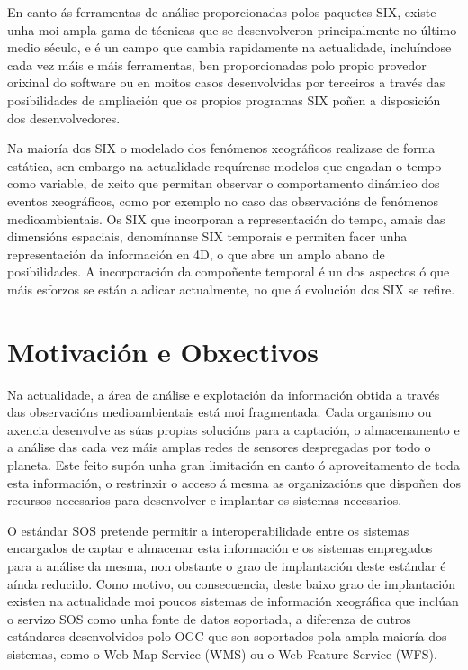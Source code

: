 En canto ás ferramentas de análise proporcionadas polos paquetes SIX, existe unha moi ampla gama de técnicas que se desenvolveron principalmente no último medio século, e é un campo que cambia rapidamente na actualidade, incluíndose cada vez máis e máis ferramentas, ben proporcionadas polo propio provedor orixinal do software ou en moitos casos desenvolvidas por terceiros a través das posibilidades de ampliación que os propios programas SIX poñen a disposición dos desenvolvedores.

Na maioría dos SIX o modelado dos fenómenos xeográficos realizase de forma estática, sen embargo na actualidade requírense modelos que engadan o tempo como variable, de xeito que permitan observar o comportamento dinámico dos eventos xeográficos, como por exemplo no caso das observacións de fenómenos medioambientais. Os SIX que incorporan a representación do tempo, amais das dimensións espaciais, denomínanse SIX temporais e permiten facer unha representación da información en 4D, o que abre un amplo abano de posibilidades. A incorporación da compoñente temporal é un dos aspectos ó que máis esforzos se están a adicar actualmente, no que á evolución dos SIX se refire.

\section{Motivación e Obxectivos}

Na actualidade, a área de análise e explotación da información obtida a través das observacións medioambientais está moi fragmentada. Cada organismo ou axencia desenvolve as súas propias solucións para a captación, o almacenamento e a análise das cada vez máis amplas redes de sensores despregadas por todo o planeta. Este feito supón unha gran limitación en canto ó aproveitamento de toda esta información, o restrinxir o acceso á mesma as organizacións que dispoñen dos recursos necesarios para desenvolver e implantar os sistemas necesarios.

O estándar SOS pretende permitir a interoperabilidade entre os sistemas encargados de captar e almacenar esta información e os sistemas empregados para a análise da mesma, non obstante o grao de implantación deste estándar é aínda reducido. Como motivo, ou consecuencia, deste baixo grao de implantación existen na actualidade moi poucos sistemas de información xeográfica que inclúan o servizo SOS como unha fonte de datos soportada, a diferenza de outros estándares desenvolvidos polo OGC que son soportados pola ampla maioría dos sistemas, como o Web Map Service (WMS) ou o Web Feature Service (WFS).

